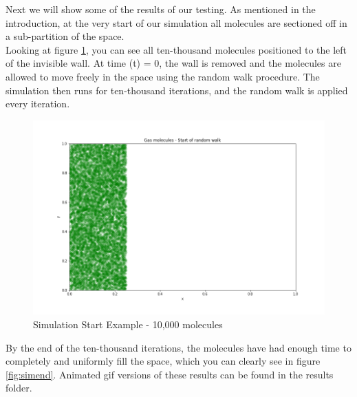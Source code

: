 \documentclass[12pt,a4paper]{article}
\begin{document}
	Next we will show some of the results of our testing. As mentioned in the introduction, at the very start of our simulation all molecules are sectioned off in a sub-partition of the space. \\
	
	Looking at figure \ref{fig:simstart}, you can see all ten-thousand molecules positioned to the left of the invisible wall. At time (t) = 0, the wall is removed and the molecules are allowed to move freely in the space using the random walk procedure. The simulation then runs for ten-thousand iterations, and the random walk is applied every iteration.\\
	
	\begin{figure}[!hb]
		\centering
		\includegraphics[width=18cm]{figures/final_start}
		\caption{Simulation Start Example - 10,000 molecules}
		\label{fig:simstart} %
	\end{figure}

	\clearpage
	
	By the end of the ten-thousand iterations, the molecules have had enough time to completely and uniformly fill the space, which you can clearly see in figure \ref{fig:simend}. Animated gif versions of these results can be found in the results folder.
	
\end{document}
